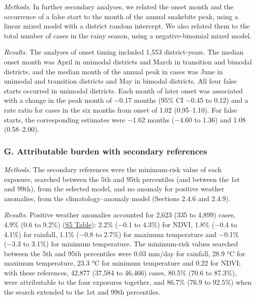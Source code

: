\documentclass[11pt,a4paper]{article}
\begin{document}
\emph{Methods.} In further secondary analyses, we related the onset month and the occurrence of a false start to the month of the annual snakebite peak, using a linear mixed model with a district random intercept. We also related them to the total number of cases in the rainy season, using a negative-binomial mixed model.

\emph{Results.} The analyses of onset timing included 1,553 district-years. The median onset month was April in unimodal districts and March in transition and bimodal districts, and the median month of the annual peak in cases was June in unimodal and transition districts and May in bimodal districts. All four false starts occurred in unimodal districts. Each month of later onset was associated with a change in the peak month of −0.17 months (95\% CI −0.45 to 0.12) and a rate ratio for cases in the six months from onset of 1.02 (0.95--1.10). For false starts, the corresponding estimates were −1.62 months (−4.60 to 1.36) and 1.08 (0.58--2.00).

\label{s1text-g}

\subsubsection*{G. Attributable burden with secondary references}

\emph{Methods.} The secondary references were the minimum-risk value of each exposure, searched between the 5th and 95th percentiles (and between the 1st and 99th), from the selected model, and no anomaly for positive weather anomalies, from the climatology--anomaly model (Sections 2.4.6 and 2.4.9).

\emph{Results.} Positive weather anomalies accounted for 2,623 (335 to 4,899) cases, 4.9\% (0.6 to 9.2\%) (\hyperref[s5table]{S5 Table}): 2.2\% (−0.1 to 4.3\%) for NDVI, 1.8\% (−0.4 to 4.1\%) for rainfall, 1.1\% (−0.8 to 2.7\%) for maximum temperature and −0.1\% (−3.3 to 3.1\%) for minimum temperature. The minimum-risk values searched between the 5th and 95th percentiles were 0.03 mm/day for rainfall, 28.9 °C for maximum temperature, 23.3 °C for minimum temperature and 0.22 for NDVI; with these references, 42,877 (37,584 to 46,466) cases, 80.5\% (70.6 to 87.3\%), were attributable to the four exposures together, and 86.7\% (76.9 to 92.5\%) when the search extended to the 1st and 99th percentiles.

\label{s1text-h}
\end{document}
